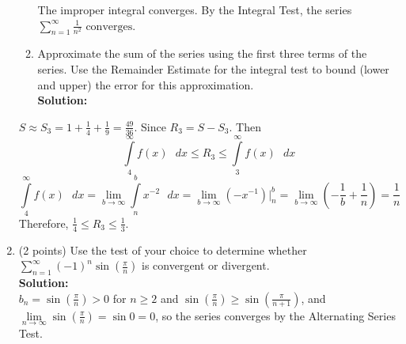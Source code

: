 \documentclass[paper=a4, fontsize=11pt]{scrartcl} %
\numberwithin{equation}{section} %
\numberwithin{figure}{section} %
\numberwithin{table}{section} %
\begin{document}
\begin{enumerate}
\begin{enumerate}
The improper integral converges. By the Integral Test, the series $\sum\limits_{n=1}^\infty \frac{1}{n^2}$ $\boxed{ \text{converges}}$.
\vspace{.25in}

\item Approximate the sum of the series using the first three terms of the series. Use the Remainder Estimate for the integral test to bound (lower and upper) the error for this approximation. \\
\noindent\textbf{Solution:}\\
\end{enumerate}
$S \approx S_3 = 1 + \frac{1}{4} + \frac{1}{9} = \frac{49}{36}$.  Since $R_3=S-S_3$.  Then
\begin{equation*}
\int\limits_4^\infty f(x) \text{ } dx \le R_3 \le \int\limits_3^\infty f(x) \text{ } dx
\end{equation*}
\begin{equation*}
\int\limits_4^\infty f(x) \text{ } dx = \lim_{b \rightarrow \infty} \int\limits_n^b x^{-2} \text{ } dx = \lim_{b \rightarrow \infty} \left( -x^{-1} \right)|^b_n = \lim_{b \rightarrow \infty} \left( -\frac{1}{b}+\frac{1}{n} \right) = \frac{1}{n}
\end{equation*}
Therefore, $\boxed{\frac{1}{4} \le R_3 \le \frac{1}{3}}$.


\newpage

\item (2 points) Use the test of your choice to determine whether 
$\sum\limits_{n=1}^\infty (-1)^n \sin \left( \frac{\pi}{n} \right)$ is convergent or divergent. \\
\noindent\textbf{Solution:}\\
$b_n=\sin \left( \frac{\pi}{n} \right)>0$ for $n \ge 2$ and $\sin \left( \frac{\pi}{n} \right) \ge \sin \left( \frac{\pi}{n+1} \right)$, and $\lim\limits_{n \rightarrow \infty} \sin \left( \frac{\pi}{n} \right) = \sin 0 = 0$, so the series converges by the Alternating Series Test.

\end{enumerate}

\end{document}
